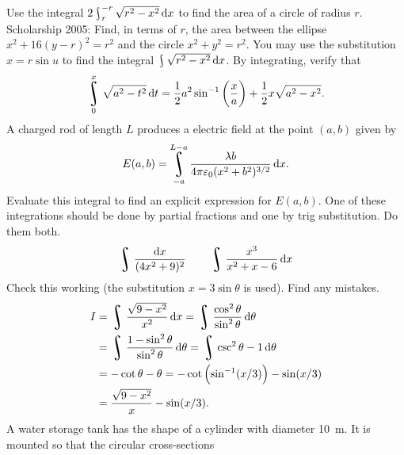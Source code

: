 \begin{questions}
  \questioS Use the integral $ 2\rint^{-r}_r \sqrt{r^2 - x^2} \dif{x} $ to find the area of a circle of radius $ r $.
  \questioS Scholarship 2005: Find, in terms of $ r $, the area between the ellipse $ x^2 + 16(y-r)^2 = r^2 $ and
            the circle $ x^2 + y^2 = r^2 $. You may use the substitution $ x = r \sin u $ to find the integral $ \rint \sqrt{r^2 - x^2} \dif{x} $.
  \questioS By integrating, verify that
            \begin{displaymath}
              \rint^x_0 \sqrt{a^2 - t^2} \dif{t} = \frac{1}{2} a^2 \sin^{-1} \left(\frac{x}{a}\right) + \frac{1}{2} x \sqrt{a^2 - x^2}.
            \end{displaymath}
  \questioS A charged rod of length $ L $ produces a electric field at the point $ (a,b) $ given by
            \begin{displaymath}
              E(a,b) = \rint^{L - a}_{-a} \frac{\lambda b}{4\pi \varepsilon_0 (x^2 + b^2)^{3/2}} \dif{x}.
            \end{displaymath}
            Evaluate this integral to find an explicit expression for $ E(a,b) $.
  \questioO One of these integrations should be done by partial fractions and one by trig substitution. Do them both.
            \begin{displaymath}
              \rint \frac{\dif{x}}{(4x^2 + 9)^2} \quad\quad \rint \frac{x^3}{x^2 + x - 6} \dif{x}
            \end{displaymath}
  \questioS Check this working (the substitution $ x = 3\sin\theta $ is used). Find any mistakes.
            \begin{align*}
              I &= \rint \frac{\sqrt{9 - x^2}}{x^2} \dif{x} = \rint \frac{\cos^2 \theta}{\sin^2 \theta} \dif{\theta}\\
                &= \rint \frac{1 - \sin^2 \theta}{\sin^2 \theta} \dif{\theta} = \rint \csc^2 \theta -1 \dif{\theta}\\
                &= -\cot \theta - \theta = -\cot\left(\sin^{-1} (x/3)\right) - \sin (x/3)\\
                &= \frac{\sqrt{9-x^2}}{x} - \sin(x/3).
            \end{align*}
  \clearpage
  \questioS A water storage tank has the shape of a cylinder with diameter \SI{10}{\metre}. It is mounted so that the circular cross-sections

\end{questions}
